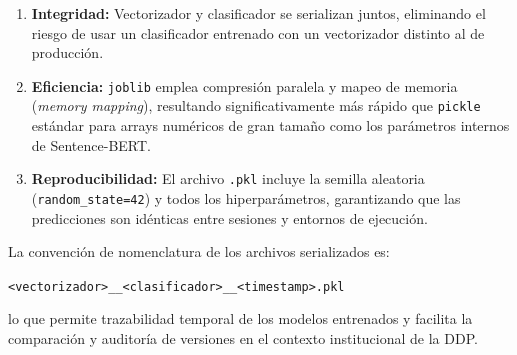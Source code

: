 \begin{enumerate}
  \item \textbf{Integridad:} Vectorizador y clasificador se serializan juntos,
        eliminando el riesgo de usar un clasificador entrenado con un
        vectorizador distinto al de producción.
  \item \textbf{Eficiencia:} \texttt{joblib} emplea compresión paralela y
        mapeo de memoria (\textit{memory mapping}), resultando significativamente
        más rápido que \texttt{pickle} estándar para arrays numéricos de gran
        tamaño como los parámetros internos de Sentence-BERT.
  \item \textbf{Reproducibilidad:} El archivo \texttt{.pkl} incluye la semilla
        aleatoria (\texttt{random\_state=42}) y todos los hiperparámetros,
        garantizando que las predicciones son idénticas entre sesiones y
        entornos de ejecución.
\end{enumerate}

La convención de nomenclatura de los archivos serializados es:

\begin{center}
  \texttt{<vectorizador>\_\_<clasificador>\_\_<timestamp>.pkl}
\end{center}

lo que permite trazabilidad temporal de los modelos entrenados y facilita la
comparación y auditoría de versiones en el contexto institucional de la DDP.